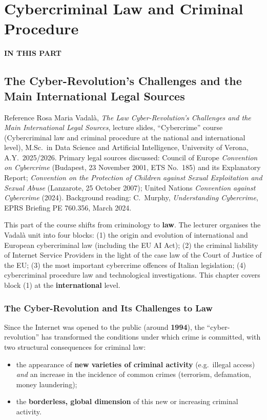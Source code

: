 \documentclass[11pt,a4paper,openany]{report}
\theoremstyle{definition}
\theoremstyle{plain}
\theoremstyle{remark}
\newcommand{\partmtoc}{%
  \vspace{2pt}{\color{rlrule}\rule{\linewidth}{0.5pt}}\par\vspace{3pt}%
  {\footnotesize\bfseries\color{rlaccent}IN THIS PART}\par\vspace{2pt}%
  \begingroup\etocsetnexttocdepth{section}\localtableofcontents\endgroup
  \vspace{2pt}{\color{rlrule}\rule{\linewidth}{0.5pt}}\par\vspace{8pt}}
\begin{document}
\part{Cybercriminal Law and Criminal Procedure}
\partmtoc

\chapter{The Cyber-Revolution's Challenges and the Main International Legal Sources}
\label{chap:intl-sources}

\begin{sourcebox}{Reference}
Rosa Maria Vadal\`a, \textit{The Law Cyber-Revolution's Challenges and the Main International Legal Sources}, lecture slides, ``Cybercrime'' course (Cybercriminal law and criminal procedure at the national and international level), M.Sc.\ in Data Science and Artificial Intelligence, University of Verona, A.Y.\ 2025/2026. Primary legal sources discussed: Council of Europe \textit{Convention on Cybercrime} (Budapest, 23 November 2001, ETS No.\ 185) and its Explanatory Report; \textit{Convention on the Protection of Children against Sexual Exploitation and Sexual Abuse} (Lanzarote, 25 October 2007); United Nations \textit{Convention against Cybercrime} (2024). Background reading: C.\ Murphy, \textit{Understanding Cybercrime}, EPRS Briefing PE 760.356, March 2024.
\end{sourcebox}

This part of the course shifts from criminology to \textbf{law}. The lecturer organises the Vadal\`a unit into four blocks: (1) the origin and evolution of international and European cybercriminal law (including the EU AI Act); (2) the criminal liability of Internet Service Providers in the light of the case law of the Court of Justice of the EU; (3) the most important cybercrime offences of Italian legislation; (4) cybercriminal procedure law and technological investigations. This chapter covers block (1) at the \textbf{international} level.

\section{The Cyber-Revolution and Its Challenges to Law}

Since the Internet was opened to the public (around \textbf{1994}), the ``cyber-revolution'' has transformed the conditions under which crime is committed, with two structural consequences for criminal law:
\begin{itemize}
    \item the appearance of \textbf{new varieties of criminal activity} (e.g.\ illegal access) \emph{and} an increase in the incidence of common crimes (terrorism, defamation, money laundering);
    \item the \textbf{borderless, global dimension} of this new or increasing criminal activity.
\end{itemize}
\end{document}
